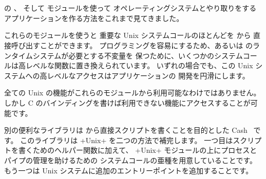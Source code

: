 %
%

\chapter*{\label{sec/more}}

\ocaml の 、  そして  モジュールを使って
オペレーティングシステムとやり取りをするアプリケーションを作る方法をこれまで見てきました。

これらのモジュールを使うと 重要な Unix システムコールのほとんどを \ocaml から
直接呼び出すことができます。
プログラミングを容易にするため、あるいは \ocaml のランタイムシステムが必要とする不変量を
保つために、いくつかのシステムコールは高レベルな関数に置き換えられています。
いずれの場合でも、この Unix システムへの高レベルなアクセスはアプリケーションの
開発を円滑にします。

全ての Unix の機能がこれらのモジュールから利用可能なわけではありません。
しかし C のバインディングを書けば利用できない機能にアクセスすることが可能です。

別の便利なライブラリは \ocaml から直接スクリプトを書くことを目的とした Cash~\cite{Cash} です。
このライブラリは \ml+Unix+ を二つの方法で補完します。
一つ目はスクリプトを書くためのヘルパー関数に加えて、
\ml+Unix+ モジュールの上にプロセスとパイプの管理を助けるための
システムコールの亜種を用意していることです。
もう一つは Unix システムに追加のエントリーポイントを追加することです。
